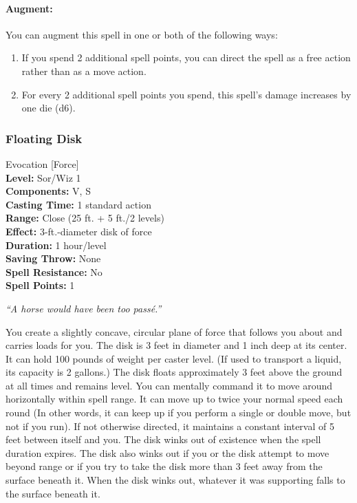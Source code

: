 \paragraph{Augment:} You can augment this spell in one or both of the following ways:
\begin{enumerate}
 \item If you spend 2 additional spell points, you can direct the spell as a free action rather than as a move action.
 \item For every 2 additional spell points you spend, this spell's damage increases by one die (d6).
\end{enumerate}
\subsubsection{Floating Disk}
\label{Spell:FloatingDisk}
Evocation [Force]
\\ \textbf{Level:} Sor/Wiz 1
\\ \textbf{Components:} V, S
\\ \textbf{Casting Time:} 1 standard action
\\ \textbf{Range:} Close (25 ft. + 5 ft./2 levels)
\\ \textbf{Effect:} 3-ft.-diameter disk of force
\\ \textbf{Duration:} 1 hour/level
\\ \textbf{Saving Throw:} None
\\ \textbf{Spell Resistance:} No
\\ \textbf{Spell Points:} 1

\emph{``A horse would have been too passé.''}

You create a slightly concave, circular plane of force that follows you about and carries loads for you. 
The disk is 3 feet in diameter and 1 inch deep at its center. 
It can hold 100 pounds of weight per caster level. (If used to transport a liquid, its capacity is 2 gallons.) 
The disk floats approximately 3 feet above the ground at all times and remains level. 
You can mentally command it to move around horizontally within spell range. 
It can move up to twice your normal speed each round (In other words, it can keep up if you perform a single or double move, but not if you run).
If not otherwise directed, it maintains a constant interval of 5 feet between itself and you. 
The disk winks out of existence when the spell duration expires. 
The disk also winks out if you or the disk attempt to move beyond range or if you try to take the disk more than 3 feet away from the surface beneath it. 
When the disk winks out, whatever it was supporting falls to the surface beneath it.

